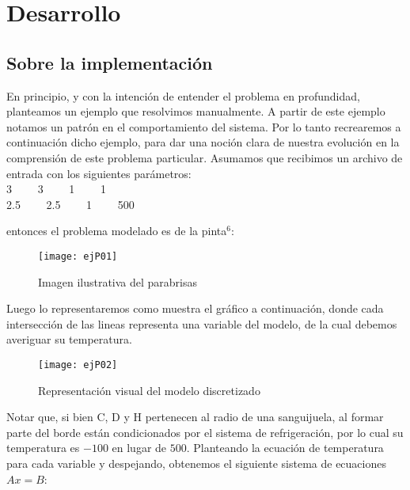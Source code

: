 \section{Desarrollo}

\subsection{Sobre la implementación}

En principio, y con la intención de entender el problema en profundidad, planteamos un ejemplo que resolvimos manualmente. A partir de este ejemplo notamos un patrón en el comportamiento del sistema. Por lo tanto recrearemos a continuación dicho ejemplo, para dar una noción clara de nuestra evolución en la comprensión de este problema particular. Asumamos que recibimos un archivo de entrada con los siguientes parámetros:\\

3 \ \ \ \   3  \ \ \ \ 1 \ \ \ \ 1\\
2.5  \ \ \ \ 2.5 \ \ \ \ 1  \ \ \ \ 500

entonces el problema modelado es de la pinta$^6$:

\begin{figure}[h]
    \centering
    \texttt{[image: ejP01]}
    \caption{Imagen ilustrativa del parabrisas}
\end{figure}

Luego lo representaremos como muestra el gráfico a continuación, donde cada intersección de las lineas representa una variable del modelo, de la cual debemos averiguar su temperatura.

\begin{figure}[h]
    \centering
    \texttt{[image: ejP02]}
    \caption{Representación visual del modelo discretizado}
\end{figure}

Notar que, si bien C, D y H pertenecen al radio de una sanguijuela, al formar parte del borde están condicionados por el sistema de refrigeración, por lo cual su temperatura es $-100$ en lugar de $500$. Planteando la ecuación de temperatura para cada variable y despejando, obtenemos el siguiente sistema de ecuaciones $Ax=B$:

